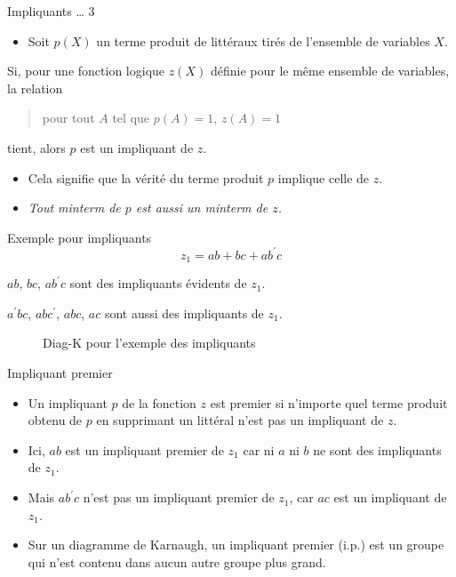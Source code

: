 \documentclass[presentation]{beamer}
\begin{document}
\begin{frame}[label={sec:orga26fc16}]{Impliquants \ldots{} 3}
\begin{itemize}
\item Soit \(p(X)\) un terme produit de littéraux tirés de l'ensemble de variables \(X\).
\end{itemize}

Si, pour une fonction logique \(z(X)\) définie pour le même ensemble de variables, la relation
\begin{quote}
\alert{pour tout \(A\) tel que \(p(A)=1\), \(z(A)=1\)}
\end{quote}
tient, alors \(p\) est un \alert{impliquant} de \(z\). 

\begin{itemize}
\item Cela signifie que la vérité du terme produit \(p\) implique celle de \(z\).

\item \emph{Tout minterm de \(p\) est aussi un minterm de \(z\).}
\end{itemize}
\end{frame}

\begin{frame}[label={sec:orgd2b6423}]{Exemple pour impliquants}
$$z_1 = ab + bc + a b^{\prime} c$$ 

\(a b\), \(b c\), \(a b^{\prime} c\) sont des impliquants évidents de \(z_1\).

\(a^{\prime} b c\), \(a b c^{\prime}\), \(a b c\), \(a c\) sont aussi des
impliquants de \(z_1\).

\begin{figure}[htbp]
\centering

\caption{\label{fig:orge7aad8b}Diag-K pour l'exemple des impliquants}
\end{figure}
\end{frame}

\begin{frame}[label={sec:org8a4490f}]{Impliquant premier}
\begin{itemize}
\item Un impliquant \(p\) de la fonction \(z\) est \alert{premier} si n'importe quel terme produit obtenu de \(p\) en supprimant un littéral n'est pas un impliquant de \(z\).

\item Ici, \(a b\) est un impliquant premier de \(z_1\) car ni \(a\) ni \(b\) ne sont des impliquants de \(z_1\).

\item Mais \(a b^{\prime} c\) n'est pas un impliquant premier de \(z_1\), car \(a c\) est un impliquant de \(z_1\).

\item Sur un diagramme de Karnaugh, un impliquant premier (i.p.) est un groupe qui n'est contenu dans aucun autre groupe plus grand.
\end{itemize}
\end{frame}
\end{document}
